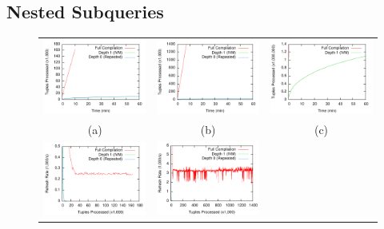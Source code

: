 \subsection{Nested Subqueries}
\begin{figure}
\begin{center}
\begin{tabular}{ccc}
\includegraphics[width=2.2in]{../graphs/graphs/time_tpch22.pdf} &
\includegraphics[width=2.2in]{../graphs/graphs/time_vwap.pdf} &
\includegraphics[width=2.2in]{../graphs/graphs/time_brokervariance.pdf} \\
(a) & (b) & (c) \\
\includegraphics[width=2.2in]{../graphs/graphs/windowedrate_tpch22.pdf} &
\includegraphics[width=2.2in]{../graphs/graphs/windowedrate_vwap.pdf} &

\end{tabular}
\end{center}
\end{figure}
